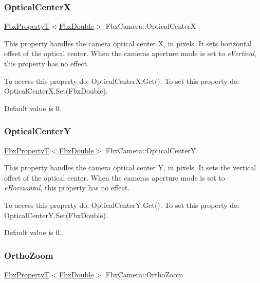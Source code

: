 \subsubsection{\texorpdfstring{Optical\+CenterX}{OpticalCenterX}}
{\footnotesize\ttfamily \hyperlink{class_fbx_property_t}{Fbx\+PropertyT}$<$\hyperlink{fbxtypes_8h_a171e72a1c46fc15c1a6c9c31948c1c5b}{Fbx\+Double}$>$ Fbx\+Camera\+::\+Optical\+CenterX}

This property handles the camera optical center X, in pixels. It sets horizontal offset of the optical center. When the camera\textquotesingle{}s aperture mode is set to {\itshape e\+Vertical}, this property has no effect.

To access this property do\+: Optical\+Center\+X.\+Get(). To set this property do\+: Optical\+Center\+X.\+Set(\+Fbx\+Double).

Default value is 0.. \mbox{\label{class_fbx_camera_a8154f4f4e907c094df2decb36e179d85}} 
\subsubsection{\texorpdfstring{Optical\+CenterY}{OpticalCenterY}}
{\footnotesize\ttfamily \hyperlink{class_fbx_property_t}{Fbx\+PropertyT}$<$\hyperlink{fbxtypes_8h_a171e72a1c46fc15c1a6c9c31948c1c5b}{Fbx\+Double}$>$ Fbx\+Camera\+::\+Optical\+CenterY}

This property handles the camera optical center Y, in pixels. It sets the vertical offset of the optical center. When the camera\textquotesingle{}s aperture mode is set to {\itshape e\+Horizontal}, this property has no effect.

To access this property do\+: Optical\+Center\+Y.\+Get(). To set this property do\+: Optical\+Center\+Y.\+Set(\+Fbx\+Double).

Default value is 0.. \mbox{\label{class_fbx_camera_a038fab99051fa0171f60f40469eff7cc}} 
\subsubsection{\texorpdfstring{Ortho\+Zoom}{OrthoZoom}}
{\footnotesize\ttfamily \hyperlink{class_fbx_property_t}{Fbx\+PropertyT}$<$\hyperlink{fbxtypes_8h_a171e72a1c46fc15c1a6c9c31948c1c5b}{Fbx\+Double}$>$ Fbx\+Camera\+::\+Ortho\+Zoom}

